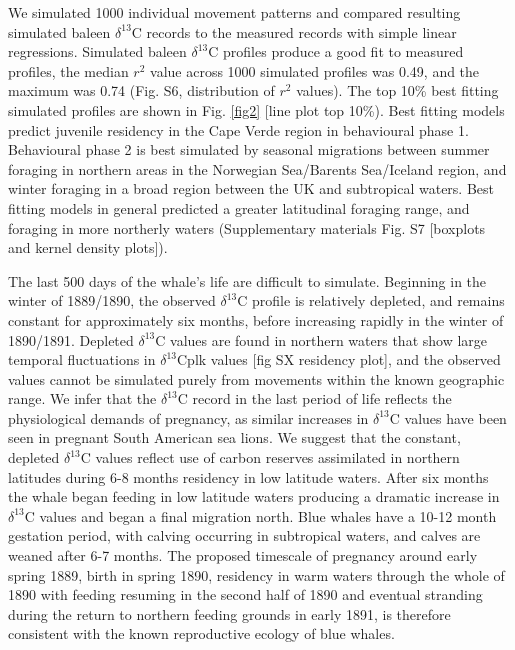\documentclass[a4paper,12pt]{article}
\begin{document}
We simulated 1000 individual movement patterns and compared resulting simulated baleen $\delta^{13}$C records to the measured records with simple linear regressions. 
Simulated baleen $\delta^{13}$C profiles produce a good fit to measured profiles, the median $r^2$ value across 1000 simulated profiles was 0.49, and the maximum was 0.74 (Fig. S6, distribution of $r^2$ values). 
The top 10\% best fitting simulated profiles are shown in Fig. \ref{fig2} [line plot top 10\%). 
Best fitting models predict juvenile residency in the Cape Verde region in behavioural phase 1. 
Behavioural phase 2 is best simulated by seasonal migrations between summer foraging in northern areas in the Norwegian Sea/Barents Sea/Iceland region, and winter foraging in a broad region between the UK and subtropical waters. 
Best fitting models in general predicted a greater latitudinal foraging range, and foraging in more northerly waters (Supplementary materials Fig. S7 [boxplots and kernel density plots]).

The last 500 days of the whale's life are difficult to simulate. 
Beginning in the winter of 1889/1890, the observed $\delta^{13}$C profile is relatively depleted, and remains constant for approximately six months, before increasing rapidly in the winter of 1890/1891. 
Depleted $\delta^{13}$C values are found in northern waters that show large temporal fluctuations in $\delta^{13}$Cplk values [fig SX residency plot], and the observed values cannot be simulated purely from movements within the known geographic range.
We infer that the $\delta^{13}$C record in the last period of life reflects the physiological demands of pregnancy, as similar increases in $\delta^{13}$C values have been seen in pregnant South American sea lions\cite{cardona2017temporal}. 
We suggest that the constant, depleted $\delta^{13}$C values reflect use of carbon reserves assimilated in northern latitudes during 6-8 months residency in low latitude waters. 
After six months the whale began feeding in low latitude waters producing a dramatic increase in $\delta^{13}$C values and began a final migration north. 
Blue whales have a 10-12 month gestation period, with calving occurring in subtropical waters, and calves are weaned after 6-7 months\cite{handbook}. 
The proposed timescale of pregnancy around early spring 1889, birth in spring 1890, residency in warm waters through the whole of 1890 with feeding resuming in the second half of 1890 and eventual stranding during the return to northern feeding grounds in early 1891, is therefore consistent with the known reproductive ecology of blue whales. 
\end{document}
